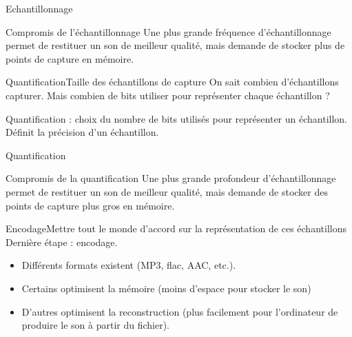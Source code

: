 \documentclass{beamer}
\begin{document}
\begin{frame}{Echantillonnage}{}
	\begin{block}{Compromis de l'échantillonnage}
		Une plus grande fréquence d'échantillonnage permet de restituer un son de meilleur qualité, mais demande de stocker plus de points de capture en mémoire.
	\end{block}
	\href{https://youtu.be/6kIHsGJSUrY?t=91}{}
\end{frame}

\begin{frame}{Quantification}{Taille des échantillons de capture}
	On sait combien d'échantillons capturer. Mais combien de bits utiliser pour représenter chaque échantillon ?
	\begin{definition}
		Quantification : choix du nombre de bits utilisés pour représenter un échantillon. Définit la précision d'un échantillon.
	\end{definition}
\end{frame}

\begin{frame}{Quantification}{}
	\begin{block}{Compromis de la quantification}
		Une plus grande profondeur d'échantillonnage permet de restituer un son de meilleur qualité, mais demande de stocker des points de capture plus gros en mémoire.
	\end{block}
	\href{https://youtu.be/6kIHsGJSUrY}{}
\end{frame}

\begin{frame}{Encodage}{Mettre tout le monde d'accord sur la représentation de ces échantillons}
	Dernière étape : encodage.
	\begin{itemize}
		\item Différents formats existent (MP3, flac, AAC, etc.).
		\item Certains optimisent la mémoire (moins d'espace pour stocker le son)
		\item D'autres optimisent la reconstruction (plus facilement pour l'ordinateur de produire le son à partir du fichier).
	\end{itemize}
\end{frame}
\end{document}
